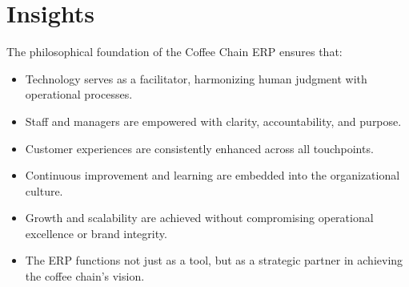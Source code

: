 \section*{Insights}

The philosophical foundation of the Coffee Chain ERP ensures that:  

\begin{itemize}
    \item Technology serves as a facilitator, harmonizing human judgment with operational processes.  
    \item Staff and managers are empowered with clarity, accountability, and purpose.  
    \item Customer experiences are consistently enhanced across all touchpoints.  
    \item Continuous improvement and learning are embedded into the organizational culture.  
    \item Growth and scalability are achieved without compromising operational excellence or brand integrity.  
    \item The ERP functions not just as a tool, but as a strategic partner in achieving the coffee chain’s vision.  
\end{itemize}
